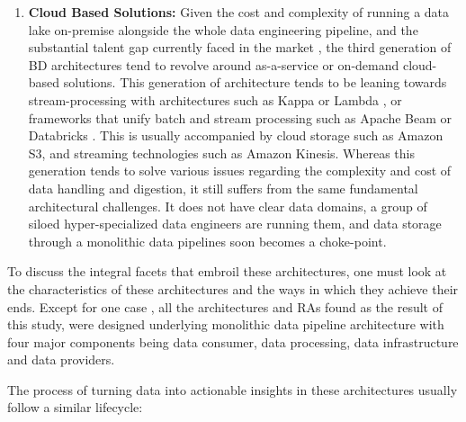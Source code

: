 \documentclass[review]{elsarticle}
\begin{document}
\begin{enumerate}
    \item \textbf{Cloud Based Solutions:} Given the cost and complexity of running a data lake on-premise alongside the whole data engineering pipeline, and the substantial talent gap currently faced in the market \cite{AtaeiHype}, the third generation of BD architectures tend to revolve around as-a-service or on-demand cloud-based solutions. This generation of architecture tends to be leaning towards stream-processing with architectures such as Kappa or Lambda \cite{lin2017lambda}, or frameworks that unify batch and stream processing such as Apache Beam \cite{ApachBeam} or Databricks \cite{DataBricks}. This is usually accompanied by cloud storage such as Amazon S3, and streaming technologies such as Amazon Kinesis. Whereas this generation tends to solve various issues regarding the complexity and cost of data handling and digestion, it still suffers from the same fundamental architectural challenges. It does not have clear data domains, a group of siloed hyper-specialized data engineers are running them, and data storage through a monolithic data pipelines soon becomes a choke-point.
\end{enumerate}

To discuss the integral facets that embroil these architectures, one must look at the characteristics of these architectures and the ways in which they achieve their ends. Except for one case \cite{AtaeiApsec}, all the architectures and RAs found as the result of this study, were designed underlying monolithic data pipeline architecture with four major components being data consumer, data processing, data infrastructure and data providers.

The process of turning data into actionable insights in these architectures usually follow a similar lifecycle:
\end{document}
